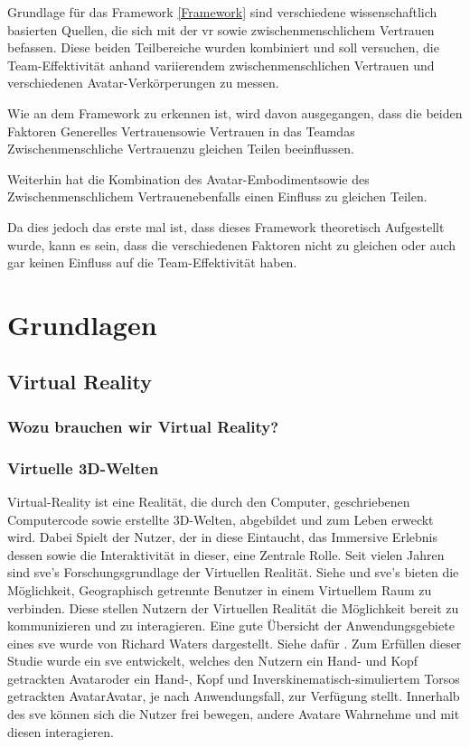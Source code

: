 \documentclass[a4paper,11pt]{article}%
\renewcommand{\\}{\vspace*{0.5\baselineskip} \newline}
\begin{document}
{Grundlage für das Framework \autoref{Framework} sind verschiedene wissenschaftlich basierten Quellen, die sich mit der \ac{vr} sowie zwischenmenschlichem Vertrauen befassen. Diese beiden Teilbereiche wurden kombiniert und soll versuchen, die Team-Effektivität anhand variierendem zwischenmenschlichen Vertrauen und verschiedenen Avatar-Verkörperungen zu messen.

Wie an dem Framework zu erkennen ist, wird davon ausgegangen, dass die beiden Faktoren \flqq Generelles Vertrauen\frqq sowie \flqq Vertrauen in das Team\frqq das \flqq Zwischenmenschliche Vertrauen\frqq zu gleichen Teilen beeinflussen. 

Weiterhin hat die Kombination des \flqq Avatar-Embodiment\frqq sowie des \flqq Zwischenmenschlichem Vertrauen\frqq ebenfalls einen Einfluss zu gleichen Teilen.

Da dies jedoch das erste mal ist, dass dieses Framework theoretisch Aufgestellt wurde, kann es sein, dass die verschiedenen Faktoren nicht zu gleichen oder auch gar keinen Einfluss auf die Team-Effektivität haben.

	\newpage
	\section{Grundlagen}
		\subsection{Virtual Reality}
		\subsubsection{Wozu brauchen wir Virtual Reality?}
			\subsubsection{Virtuelle 3D-Welten}
Virtual-Reality ist eine Realität, die durch den Computer, geschriebenen Computercode sowie erstellte 3D-Welten, abgebildet und zum Leben erweckt wird. Dabei Spielt der Nutzer, der in diese Eintaucht, das Immersive Erlebnis dessen sowie die Interaktivität in dieser, eine Zentrale Rolle. \citep[p.6-12]{sherman2018understanding}
	Seit vielen Jahren sind \ac{sve}'s Forschungsgrundlage der Virtuellen Realität. Siehe \citep{shuffler2011there} \citep{steed1999leadership} und \citep{de2011level} \\
	\ac{sve}'s bieten die Möglichkeit, Geographisch getrennte Benutzer in einem Virtuellem Raum zu verbinden. Diese stellen Nutzern der Virtuellen Realität die Möglichkeit bereit zu kommunizieren und zu interagieren. \citep[p. 1-3]{pettifer1999designing} Eine gute Übersicht der Anwendungsgebiete eines \ac{sve} wurde von Richard Waters dargestellt. Siehe dafür \citep{waters1997rise}.
	Zum Erfüllen dieser Studie wurde ein \ac{sve} entwickelt, welches den Nutzern ein \grqq Hand- und Kopf getrackten Avatar\grqq oder ein \grqq Hand-, Kopf und Inverskinematisch-simuliertem Torsos getrackten Avatar\grqq Avatar, je nach Anwendungsfall, zur Verfügung stellt. Innerhalb des \ac{sve} können sich die Nutzer frei bewegen, andere Avatare Wahrnehme und mit diesen interagieren.
	
}
\end{document}
